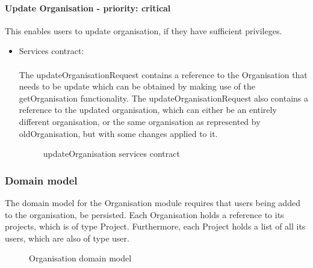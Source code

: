 \paragraph{Update Organisation - priority: critical}
This enables users to update organisation, if they have sufficient privileges.

\begin{itemize}
	\item Services contract:\\ \\
	The updateOrganisationRequest contains a reference to the Organisation that needs to be update which can be obtained by making use of the getOrganisation functionality. The updateOrganisationRequest also contains a reference to the updated organisation, which can either be an entirely different organisation, or the same organisation as represented by oldOrganisation, but with some changes applied to it.
	\begin{figure}[H]
    	\centering
    	\caption{updateOrganisation services contract}
    	\label{fig:updateOrganisation_services_contract}
   	\end{figure}
\end{itemize}

\subsubsection{Domain model}
The domain model for the Organisation module requires that users being added to the organisation, be persisted. Each Organisation holds a reference to its projects, which is of type Project. Furthermore, each Project holds a list of all its users, which are also of type user.
\begin{figure}[H]
	\centering
	\caption{Organisation domain model}
	\label{fig:Orgnaisnation_domain_model}
\end{figure}
